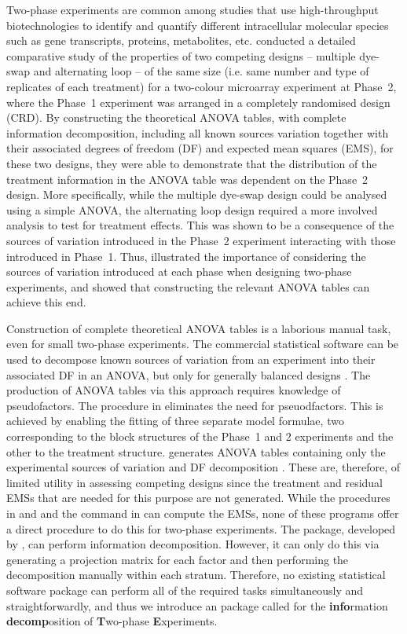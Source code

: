 \documentclass[article]{jss}
\begin{document}
Two-phase experiments are common among studies that use high-throughput biotechnologies to identify and quantify different intracellular molecular species such as gene transcripts, proteins, metabolites, etc. \cite{Jarrett2008} conducted a detailed comparative study of the properties of two competing designs -- multiple dye-swap and alternating loop \citep{Churchill2002} -- of the same size (i.e. same number and type of replicates of each treatment) for a two-colour microarray experiment at Phase~2, where the Phase~1 experiment was arranged in a completely randomised design (CRD). By constructing the theoretical ANOVA tables, with complete information decomposition, including all known sources variation together with their associated degrees of freedom (DF) and expected mean squares (EMS), for these two designs, they were able to demonstrate that the distribution of the treatment information in the ANOVA table was dependent on the Phase~2 design. More specifically, while the multiple dye-swap design could be analysed using a simple ANOVA, the alternating loop design required a more involved analysis to test for treatment effects. This was shown to be a consequence of the sources of variation introduced in the Phase~2 experiment interacting with those introduced in Phase~1. Thus, \cite{Jarrett2008} illustrated the importance of considering the sources of variation introduced at each phase when designing two-phase experiments, and showed that constructing the relevant ANOVA tables can achieve this end.

Construction of complete theoretical ANOVA tables is a laborious manual task, even for small two-phase experiments. The commercial statistical software  can be used to decompose known sources of variation from an experiment into their associated DF in an ANOVA, but only for generally balanced designs \citep{Payne2003}. The production of ANOVA tables via this approach requires knowledge of pseudofactors. The  procedure in  eliminates the need for pseuodfactors. This is achieved by enabling the fitting of three separate model formulae, two corresponding to the block structures of the Phase~1 and 2 experiments and the other to the treatment structure.  generates ANOVA tables containing only the experimental sources of variation and DF decomposition \citep{Brien2006a}. These are, therefore, of limited utility in assessing competing designs since the treatment and residual EMSs that are needed for this purpose are not generated. While the  procedures in  and  and the  command in  can compute the EMSs, none of these programs offer a direct procedure to do this for two-phase experiments. The   package, developed by \cite{Brien2011a}, can perform information decomposition. However, it can only do this via generating a projection matrix for each factor and then performing the decomposition manually within each stratum. Therefore, no existing statistical software package can perform all of the required tasks simultaneously and straightforwardly, and thus we introduce an  package called  for the {\bf info}rmation {\bf decomp}osition of {\bf T}wo-phase {\bf E}xperiments.
\end{document}
